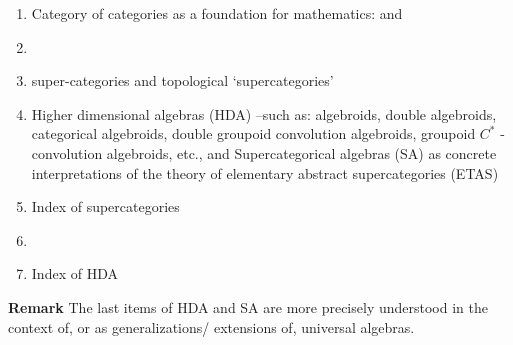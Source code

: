 \documentclass[12pt]{article}
\begin{document}
\begin{enumerate}
\item Category of categories as a foundation for mathematics:  and 

\item {}

\item super-categories and topological `supercategories'

\item Higher dimensional algebras (HDA) --such as:  algebroids, double algebroids, categorical algebroids, double groupoid convolution algebroids, groupoid $C^*$ -convolution algebroids, etc.,  and Supercategorical algebras (SA) as concrete interpretations of the theory of elementary abstract supercategories (ETAS)
\item Index of supercategories

\item {}

\item Index of HDA

\end{enumerate}

\textbf{Remark}  The last items of HDA  and SA are more precisely understood in the context of, or as generalizations/ extensions of, universal algebras. 
\end{document}

